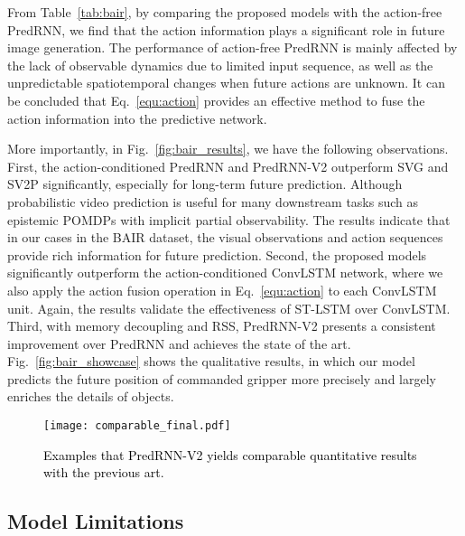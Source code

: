 \documentclass[10pt,journal,compsoc]{IEEEtran}
\newcommand{\eqn}[1]{Eq.~\eqref{#1}}
\newcommand{\tab}[1]{Table~\ref{#1}}
\newcommand{\fig}[1]{Fig.~\ref{#1}}
\newcommand{\revise}[1]{{\textcolor{black}{#1}}}
\begin{document}
From \tab{tab:bair}, by comparing the proposed models with the action-free PredRNN, we find that the action information plays a significant role in future image generation. The performance of action-free PredRNN is mainly affected by the lack of observable dynamics due to limited input sequence, as well as the unpredictable spatiotemporal changes when future actions are unknown. It can be concluded that \eqn{equ:action} provides an effective method to fuse the action information into the predictive network.



More importantly, in \fig{fig:bair_results}, we have the following observations.
First, the action-conditioned PredRNN and PredRNN-V2 outperform SVG and SV2P significantly, especially for long-term future prediction. Although probabilistic video prediction is useful for many downstream tasks such as epistemic POMDPs with implicit partial observability. The results indicate that in our cases in the BAIR dataset, the visual observations and action sequences provide rich information for future prediction.
Second, the proposed models significantly outperform the action-conditioned ConvLSTM network, where we also apply the action fusion operation in \eqn{equ:action} to each ConvLSTM unit. Again, the results validate the effectiveness of ST-LSTM over ConvLSTM.
Third, with memory decoupling and RSS, PredRNN-V2 presents a consistent improvement over PredRNN and achieves the state of the art. \fig{fig:bair_showcase} shows the qualitative results, in which our model predicts the future position of commanded gripper more precisely and largely enriches the details of objects.


\begin{figure}[t]
  \centering
  \texttt{[image: comparable\_final.pdf]}
  \vskip -0.05in
  \caption{
  \revise{Examples that PredRNN-V2 yields comparable quantitative results with the previous art. 
  }
  }
  \label{fig:comparable}
  \vspace{-5pt}
\end{figure}

\subsection{Model Limitations}
\end{document}
